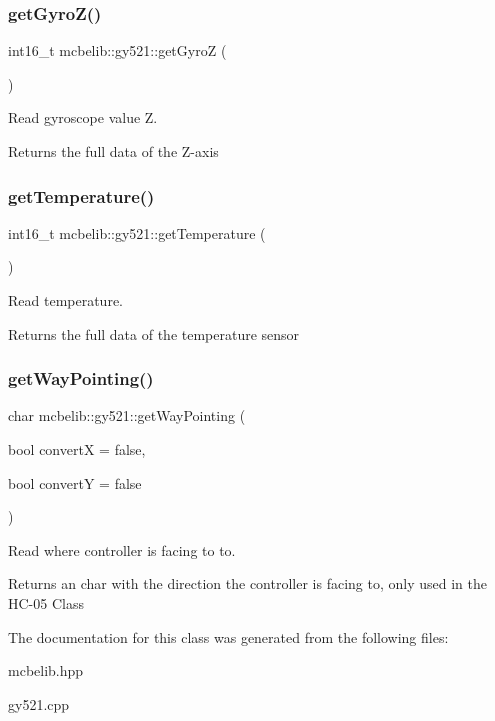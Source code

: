 \subsubsection{\texorpdfstring{get\+Gyro\+Z()}{getGyroZ()}}
{\footnotesize\ttfamily int16\+\_\+t mcbelib\+::gy521\+::get\+GyroZ (\begin{DoxyParamCaption}{ }\end{DoxyParamCaption})}



Read gyroscope value Z. 

Returns the full data of the Z-\/axis \mbox{\label{classmcbelib_1_1gy521_abb1275aa14cf35844900e91fded2bad0}} 
\subsubsection{\texorpdfstring{get\+Temperature()}{getTemperature()}}
{\footnotesize\ttfamily int16\+\_\+t mcbelib\+::gy521\+::get\+Temperature (\begin{DoxyParamCaption}{ }\end{DoxyParamCaption})}



Read temperature. 

Returns the full data of the temperature sensor \mbox{\label{classmcbelib_1_1gy521_af0d109f92f90dd9c4ae28c6fdacd9a88}} 
\subsubsection{\texorpdfstring{get\+Way\+Pointing()}{getWayPointing()}}
{\footnotesize\ttfamily char mcbelib\+::gy521\+::get\+Way\+Pointing (\begin{DoxyParamCaption}\item[{bool}]{convertX = {\ttfamily false},  }\item[{bool}]{convertY = {\ttfamily false} }\end{DoxyParamCaption})}



Read where controller is facing to to. 

Returns an char with the direction the controller is facing to, only used in the H\+C-\/05 Class 

The documentation for this class was generated from the following files\+:\begin{DoxyCompactItemize}
\item 
mcbelib.\+hpp\item 
gy521.\+cpp\end{DoxyCompactItemize}
